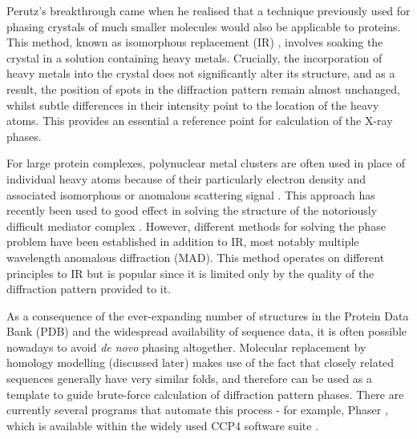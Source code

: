 \documentclass[a4paper,11pt,twoside,openright]{scrbook}
\begin{document}
Perutz's breakthrough came when he realised that a technique previously used for phasing crystals of much smaller molecules would also be applicable to proteins. This method, known as isomorphous replacement (IR)  \cite{Robertson1936}, involves soaking the crystal in a solution containing heavy metals. Crucially, the incorporation of heavy metals into the crystal does not significantly alter its structure, and as a result, the position of spots in the diffraction pattern remain almost unchanged, whilst subtle differences in their intensity point to the location of the heavy atoms. This provides an essential a reference point for calculation of the X-ray phases.

For large protein complexes, polynuclear metal clusters are often used in place of individual heavy atoms because of their particularly electron density and associated isomorphous or anomalous scattering signal \cite{Dauter2005}. This approach has recently been used to good effect in solving the structure of the notoriously difficult mediator complex \cite{Nozawa2017}. However, different methods for solving the phase problem have been established in addition to IR, most notably multiple wavelength anomalous diffraction (MAD). This method operates on different principles to IR but is popular since it is limited only by the quality of the diffraction pattern provided to it.

As a consequence of the ever-expanding number of structures in the Protein Data Bank \cite{Berman2000} (PDB) and the widespread availability of sequence data, it is often possible nowadays to avoid \textit{de novo} phasing altogether. Molecular replacement by homology modelling (discussed later) makes use of the fact that closely related sequences generally have very similar folds, and therefore can be used as a template to guide brute-force calculation of diffraction pattern phases. There are currently several programs that automate this process - for example, Phaser \cite{McCoy2007}, which is available within the widely used CCP4 software suite \cite{Winn2011a}.

\end{document}
